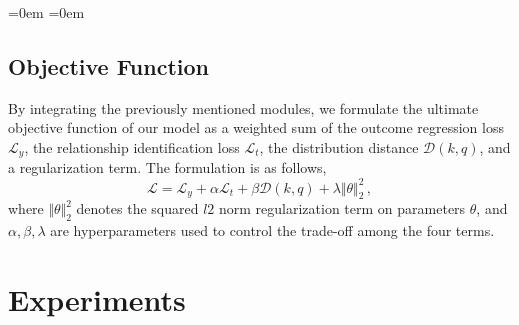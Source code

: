 \documentclass[twoside,leqno,twocolumn]{article}
\begin{document}
\begin{list}{}{\leftmargin=0em \itemindent=0em \topsep=0pt \parsep=0pt \itemsep=2pt}
\subsection{Objective Function}
By integrating the previously mentioned modules, we formulate the ultimate objective function of our model as a weighted sum of the outcome regression loss $\mathcal{L}_y$, the relationship identification loss $\mathcal{L}_t$, the distribution distance $\mathcal{D}(k,q)$, and a regularization term. The formulation is as follows,
\begin{equation}
\label{eq16}
    \mathcal{L} = \mathcal{L}_y + \alpha \mathcal{L}_t + \beta \mathcal{D}(k,q) + \lambda \Vert \theta \Vert_2^2 \,,
\end{equation}
where $\Vert \theta \Vert_2^2$ denotes the squared $l2$ norm regularization term on parameters $\theta$, and
$ \alpha, \beta, \lambda$ are hyperparameters used to control the trade-off among the four terms.
\end{list}

\section{Experiments}
\end{document}
